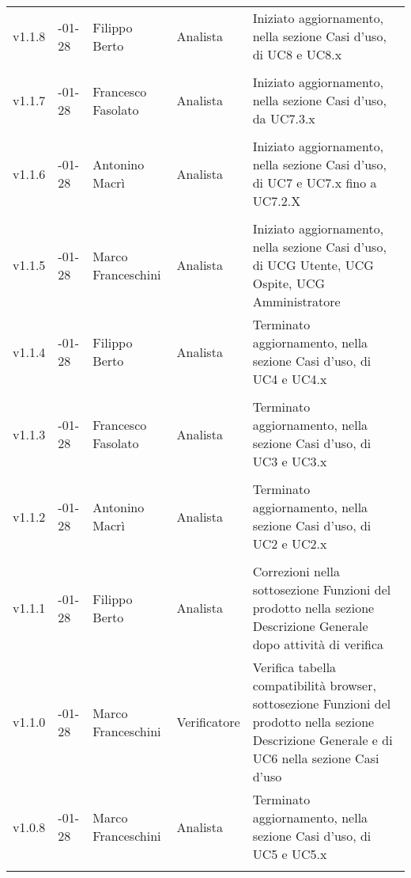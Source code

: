 \begin{longtable} { >{\centering}p{1.4cm} >{\centering}p{2cm} >{\centering}p{2.3cm} >{\centering}p{2.7cm} p{5.5cm} }
		v1.1.8 & 2017-01-28 & Filippo Berto & Analista & Iniziato aggiornamento, nella sezione Casi d'uso, di UC8 e UC8.x \\ \\
		\addlinespace[0.4em]
		\midrule
		\addlinespace[0.4em]
		v1.1.7 & 2017-01-28 & Francesco Fasolato & Analista & Iniziato aggiornamento, nella sezione Casi d'uso, da UC7.3.x\\ \\
		\addlinespace[0.4em]
		\midrule
		\addlinespace[0.4em]
		v1.1.6 & 2017-01-28 & Antonino Macrì & Analista & Iniziato aggiornamento, nella sezione Casi d'uso, di UC7 e UC7.x fino a UC7.2.X \\ \\
		\addlinespace[0.4em]
		\midrule
		\addlinespace[0.4em]
		v1.1.5 & 2017-01-28 & Marco Franceschini & Analista & Iniziato aggiornamento, nella sezione Casi d'uso, di UCG Utente, UCG Ospite, UCG Amministratore \\ 
		\addlinespace[0.4em]
		\midrule
		\addlinespace[0.4em]
		v1.1.4 & 2017-01-28 & Filippo Berto & Analista & Terminato aggiornamento, nella sezione Casi d'uso, di UC4 e UC4.x \\ \\
		\addlinespace[0.4em]
		\midrule
		\addlinespace[0.4em]
		v1.1.3 & 2017-01-28 & Francesco Fasolato & Analista & Terminato aggiornamento, nella sezione Casi d'uso, di UC3 e UC3.x \\ \\
		\addlinespace[0.4em]
		\midrule
		\addlinespace[0.4em]
		v1.1.2 & 2017-01-28 & Antonino Macrì & Analista & Terminato aggiornamento, nella sezione Casi d'uso, di UC2 e UC2.x \\ \\
		\addlinespace[0.4em]
		\midrule
		\addlinespace[0.4em]
		v1.1.1 & 2017-01-28 & Filippo Berto & Analista & Correzioni nella sottosezione Funzioni del prodotto nella sezione Descrizione Generale dopo attività di verifica \\ 
		\addlinespace[0.4em]
		\midrule
		\addlinespace[0.4em]
		v1.1.0 & 2017-01-28 & Marco Franceschini & Verificatore & Verifica tabella compatibilità browser, sottosezione Funzioni del prodotto nella sezione Descrizione Generale e di UC6 nella sezione Casi d'uso\\ 
		\addlinespace[0.4em]
		\midrule
		\addlinespace[0.4em]
		v1.0.8 & 2017-01-28 & Marco Franceschini & Analista & Terminato aggiornamento, nella sezione Casi d'uso, di UC5 e UC5.x \\ \\

\end{longtable}
